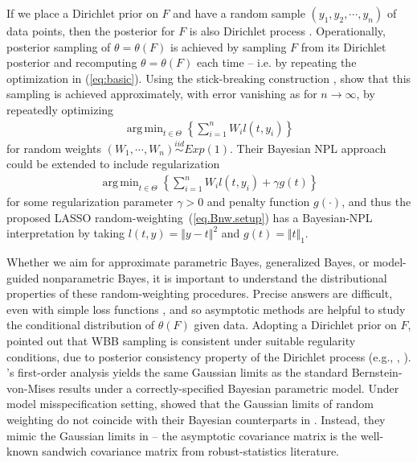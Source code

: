\documentclass[ejs,authoryear,linksfromyear]{imsart}
\DeclareMathOperator*{\argmin}{arg\,min} %
\newcommand{\sumin}{\sum_{i=1}^n} %
\numberwithin{equation}{section}
\theoremstyle{plain}
\begin{document}
If we  place a Dirichlet prior on $F$ and have a random sample $(y_1, y_2, \cdots, y_n)$ of data points, then the posterior for $F$ is also Dirichlet process \citep[e.g.,][]{ferguson1973}. Operationally, posterior sampling of $\theta=\theta(F)$ is achieved by  sampling $F$ from its Dirichlet posterior and recomputing $\theta=\theta(F)$ each time -- i.e. by repeating the optimization in (\ref{eq:basic}). Using the stick-breaking construction  \citep[e.g.,][]{Sethuraman1994,Ishwaran2002}, \citet{Fong2019ICML} show that this sampling
is achieved approximately, with error vanishing
 as for $n \to \infty$, by repeatedly optimizing
\begin{eqnarray} \label{eq:BayesianNPL}
\argmin_{t \in \Theta}
\left\{
\sumin
W_i l(t, y_i) 
\right\}  
\end{eqnarray}
for random weights $(W_1, \cdots, W_n) \stackrel{iid}{\sim}  Exp(1)$.
Their Bayesian NPL approach could be extended to include regularization
\begin{eqnarray} \label{eq:LossNPL}
\argmin_{t \in \Theta}
\left\{
\sumin
W_i l(t, y_i)
+ \gamma g(t) 
\right\}  
\end{eqnarray}  
for some regularization parameter $\gamma > 0$ and penalty function $g(\cdot)$, and thus the proposed
LASSO random-weighting~(\ref{eq.Bnw.setup}) has a Bayesian-NPL interpretation by taking $l(t,y) = \Vert y-t \Vert^2$ and $g(t) = \Vert t \Vert_1$.   

Whether we aim for approximate parametric Bayes, generalized Bayes, or model-guided nonparametric Bayes, it is important to understand the distributional properties of these random-weighting procedures.
Precise answers are difficult, even with simple loss functions \citep[e.g.,][]{hjort2005exact}, and so asymptotic methods are helpful to study the conditional distribution of $\theta(F)$ given data. Adopting a Dirichlet prior on $F$, \citet{Fong2019ICML} pointed out that WBB sampling is consistent  under suitable regularity conditions, due to posterior consistency property of the Dirichlet process (e.g., \cite{ghosal1999}, \cite{ghosal2000}). \citet{Newton&Raftery}'s first-order analysis  yields the same Gaussian limits as the standard Bernstein-von-Mises results \citep[e.g.,][]{vanderVaartbook} under a correctly-specified Bayesian parametric model. Under model misspecification setting, \citet{Lyddon2019Biometrika} showed that the Gaussian limits of random weighting do not coincide with their Bayesian counterparts in \citet{kleijn2012}. Instead, they  mimic the Gaussian limits in \citet{huber1967} -- the asymptotic covariance matrix  is the well-known sandwich covariance matrix from robust-statistics literature.
\end{document}
